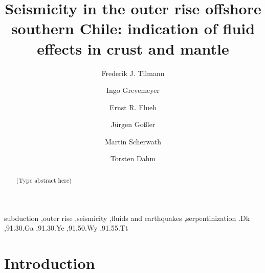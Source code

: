 \documentclass[reviewcopy]{elsart}
\begin{document}
\begin{frontmatter}



\title{Seismicity in the outer rise offshore southern Chile:
  indication of fluid effects in crust and mantle}


\author[cam]{Frederik J. Tilmann}
\author[ifm]{Ingo Grevemeyer}
\author[ifm]{Ernst R. Flueh}
\author[ifm]{J\"urgen Go{\ss}ler}
\author[ifm]{Martin Scherwath}
\author[ham]{Torsten Dahm}

\address[cam]{Bullard Laboratories, University of Cambridge,
  Cambridge CB3 0EZ, UK}
\address[ifm]{IfM-GEOMAR, Kiel, Germany}
\address[ham]{Institute for Geophysics, University of Hamburg, Hamburg, Germany}

\begin{abstract}
(Type abstract here)
\end{abstract}

\begin{keyword}
subduction \sep outer rise \sep seismicity \sep fluids and earthquakes \sep serpentinization
.Dk \sep 91.30.Ga \sep 91.30.Ye \sep 91.50.Wy \sep 91.55.Tt
\end{keyword}

\end{frontmatter}

\section{Introduction}
\end{document}
